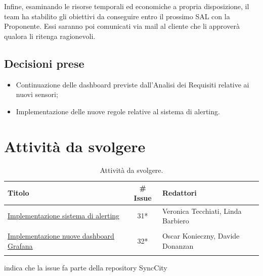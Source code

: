 \documentclass[8pt]{article}
\begin{document}
Infine, esaminando le risorse temporali ed economiche a propria disposizione, il team ha stabilito gli obiettivi da conseguire entro il prossimo SAL con la Proponente. Essi saranno poi comunicati via mail al cliente che li approverà qualora li ritenga ragionevoli.

\subsection{Decisioni prese}
\begin{itemize}
	\setlength\itemsep{0em}
	\item Continuazione delle dashboard previste dall'Analisi dei Requisiti relative ai nuovi sensori;
	\item Implementazione delle nuove regole relative al sistema di alerting.
\end{itemize}
\newpage
\section{Attività da svolgere}
\begin{table}[ht!]
	\centering
	\begin{tabular}{p{7cm}cp{7cm}}
		\toprule
		\textbf{Titolo} & \textbf{\# Issue} & \textbf{Redattori} \\
		\midrule
		\href{https://github.com/NaN1fy/SyncCity/issues/31}{\underline{Implementazione sistema di alerting}} & 31*\tnote{*} & Veronica Tecchiati, Linda Barbiero \\\\
		\href{https://github.com/NaN1fy/SyncCity/issues/32}{\underline{Implementazione nuove dashboard Grafana}} & 32*\tnote{*} & Oscar Konieczny, Davide Donanzan \\\\
		\bottomrule
	\end{tabular}
	\begin{tablenotes}
		\vspace{1em}
		\item * indica che la issue fa parte della repository SyncCity
	\end{tablenotes}
	\caption{Attività da svolgere.}
	\label{table:Attivita da svolgere}
\end{table}
\end{document}
